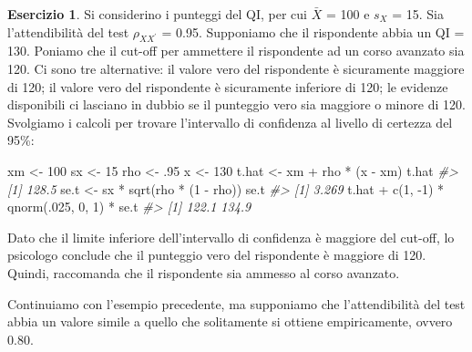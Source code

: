 \documentclass[
  11pt,
]{krantz}
\makeatletter
\newenvironment{Shaded}{\begin{snugshade}}{\end{snugshade}}
\newcommand{\CommentTok}[1]{\textcolor[rgb]{0.37,0.37,0.37}{\textit{#1}}}
\newcommand{\DecValTok}[1]{\textcolor[rgb]{0.06,0.06,0.06}{#1}}
\newcommand{\FunctionTok}[1]{\textcolor[rgb]{0,0,0}{#1}}
\newcommand{\NormalTok}[1]{#1}
\newcommand{\OtherTok}[1]{\textcolor[rgb]{0.37,0.37,0.37}{#1}}
\newcommand{\SpecialCharTok}[1]{\textcolor[rgb]{0,0,0}{#1}}
\newenvironment{kframe}{%
\medskip{}
\setlength{\fboxsep}{.8em}
 \def\at@end@of@kframe{}%
 \ifinner\ifhmode%
  \def\at@end@of@kframe{\end{minipage}}%
  \begin{minipage}{\columnwidth}%
 \fi\fi%
 \def\FrameCommand##1{\hskip\@totalleftmargin \hskip-\fboxsep
 \colorbox{shadecolor}{##1}\hskip-\fboxsep
     \hskip-\linewidth \hskip-\@totalleftmargin \hskip\columnwidth}%
 \MakeFramed {\advance\hsize-\width
   \@totalleftmargin\z@ \linewidth\hsize
   \@setminipage}}%
 {\par\unskip\endMakeFramed%
 \at@end@of@kframe}
\renewenvironment{Shaded}{\begin{kframe}}{\end{kframe}}
\theoremstyle{definition}
\theoremstyle{definition}
\theoremstyle{definition}
\newtheorem{exercise}{Esercizio}[chapter]
\theoremstyle{definition}
\theoremstyle{remark}
\makeatother
\begin{document}
\begin{exercise}
Si considerino i punteggi del QI, per cui \(\bar{X}\) = 100 e \(s_X\) = 15. Sia l'attendibilità del test \(\rho_{XX^\prime}\) = 0.95. Supponiamo che il rispondente abbia un QI = 130. Poniamo che il cut-off per ammettere il rispondente ad un corso avanzato sia 120. Ci sono tre alternative: il valore vero del rispondente è sicuramente maggiore di 120; il valore vero del rispondente è sicuramente inferiore di 120; le evidenze disponibili ci lasciano in dubbio se il punteggio vero sia maggiore o minore di 120. Svolgiamo i calcoli per trovare l'intervallo di confidenza al livello di certezza del 95\%:

\begin{Shaded}
\begin{Highlighting}[]
\NormalTok{xm }\OtherTok{\textless{}{-}} \DecValTok{100}
\NormalTok{sx }\OtherTok{\textless{}{-}} \DecValTok{15}
\NormalTok{rho }\OtherTok{\textless{}{-}}\NormalTok{ .}\DecValTok{95}
\NormalTok{x }\OtherTok{\textless{}{-}} \DecValTok{130}
\NormalTok{t.hat }\OtherTok{\textless{}{-}}\NormalTok{ xm }\SpecialCharTok{+}\NormalTok{ rho }\SpecialCharTok{*}\NormalTok{ (x }\SpecialCharTok{{-}}\NormalTok{ xm)}
\NormalTok{t.hat}
\CommentTok{\#\textgreater{} [1] 128.5}
\NormalTok{se.t }\OtherTok{\textless{}{-}}\NormalTok{ sx }\SpecialCharTok{*} \FunctionTok{sqrt}\NormalTok{(rho }\SpecialCharTok{*}\NormalTok{ (}\DecValTok{1} \SpecialCharTok{{-}}\NormalTok{ rho))}
\NormalTok{se.t}
\CommentTok{\#\textgreater{} [1] 3.269}
\NormalTok{t.hat }\SpecialCharTok{+} \FunctionTok{c}\NormalTok{(}\DecValTok{1}\NormalTok{, }\SpecialCharTok{{-}}\DecValTok{1}\NormalTok{) }\SpecialCharTok{*} \FunctionTok{qnorm}\NormalTok{(.}\DecValTok{025}\NormalTok{, }\DecValTok{0}\NormalTok{, }\DecValTok{1}\NormalTok{) }\SpecialCharTok{*}\NormalTok{ se.t}
\CommentTok{\#\textgreater{} [1] 122.1 134.9}
\end{Highlighting}
\end{Shaded}

Dato che il limite inferiore dell'intervallo di confidenza è maggiore del cut-off, lo psicologo conclude che il punteggio vero del rispondente è maggiore di 120. Quindi, raccomanda che il rispondente sia ammesso al corso avanzato.

Continuiamo con l'esempio precedente, ma supponiamo che l'attendibilità del test abbia un valore simile a quello che solitamente si ottiene empiricamente, ovvero 0.80.


\end{exercise}
\end{document}
